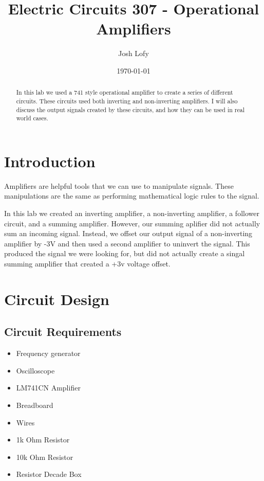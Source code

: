 \documentclass[a4paper]{article}
\title{Electric Circuits 307 - Operational Amplifiers}
\author{Josh Lofy}
\date{\today}
\begin{document}
\maketitle

\begin{abstract}
In this lab we used a 741 style operational amplifier to create a series of different circuits.  These circuits used both inverting and non-inverting amplifiers.  I will also discuss the output signals created by these circuits, and how they can be used in real world cases.
\end{abstract}

\section{Introduction}

Amplifiers are helpful tools that we can use to manipulate signals.  These manipulations are the same as performing mathematical logic rules to the signal.  

In this lab we created an inverting amplifier, a non-inverting amplifier, a follower circuit, and a summing amplifier.  However, our summing aplifier did not actually sum an incoming signal.  Instead, we offset our output signal of a non-inverting amplifier by -3V and then used a second amplifier to uninvert the signal.  This produced the signal we were looking for, but did not actually create a singal summing amplifier that created a +3v voltage offset.

\section{Circuit Design}

\subsection{Circuit Requirements}

\begin{itemize}
\item Frequency generator
\item Oscilloscope
\item LM741CN Amplifier
\item Breadboard
\item Wires
\item 1k Ohm Resistor
\item 10k Ohm Resistor
\item Resistor Decade Box
\end{itemize}
\end{document}
